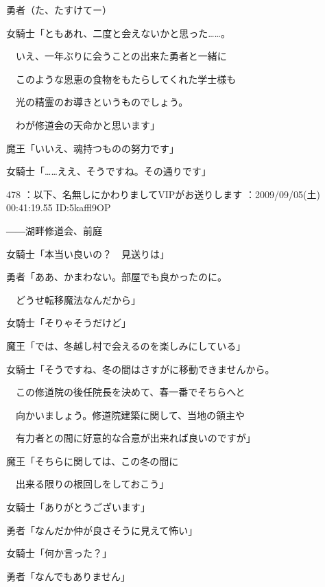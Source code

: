 \documentclass[a4j,twocolumn]{tarticle}
\begin{document}
勇者（た、たすけてー） 



女騎士「ともあれ、二度と会えないかと思った……。\par{} 
　いえ、一年ぶりに会うことの出来た勇者と一緒に\par{} 
　このような恩恵の食物をもたらしてくれた学士様も\par{} 
　光の精霊のお導きというものでしょう。\par{} 
　わが修道会の天命かと思います」 



魔王「いいえ、魂持つものの努力です」 



女騎士「……ええ、そうですね。その通りです」 

	
    
    

478 ：以下、名無しにかわりましてVIPがお送りします ：2009/09/05(土) 00:41:19.55 ID:5kaffl9OP 


――湖畔修道会、前庭 



女騎士「本当い良いの？　見送りは」 



勇者「ああ、かまわない。部屋でも良かったのに。\par{} 
　どうせ転移魔法なんだから」\par{} 
女騎士「そりゃそうだけど」 



魔王「では、冬越し村で会えるのを楽しみにしている」 



女騎士「そうですね、冬の間はさすがに移動できませんから。\par{} 
　この修道院の後任院長を決めて、春一番でそちらへと\par{} 
　向かいましょう。修道院建築に関して、当地の領主や \par{}
　有力者との間に好意的な合意が出来れば良いのですが」 



魔王「そちらに関しては、この冬の間に\par{} 
　出来る限りの根回しをしておこう」\par{} 
女騎士「ありがとうございます」 



勇者「なんだか仲が良さそうに見えて怖い」\par{} 
女騎士「何か言った？」 



勇者「なんでもありません」 
\end{document}
